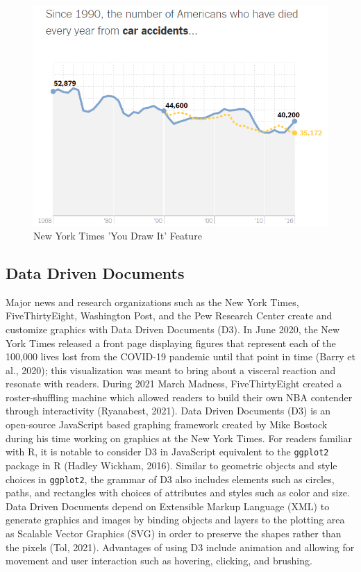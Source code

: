 \documentclass[print]{nuthesis}
\begin{document}
\begin{figure}[tbp]

{\centering \includegraphics[width=0.75\linewidth,]{images/02-you-draw-it/nyt-caraccidents-frame4} 

}

\caption{New York Times 'You Draw It' Feature}\label{fig:nyt-caraccidents}
\end{figure}

\hypertarget{data-driven-documents}{%
\subsection{Data Driven Documents}\label{data-driven-documents}}

Major news and research organizations such as the New York Times, FiveThirtyEight, Washington Post, and the Pew Research Center create and customize graphics with Data Driven Documents (D3).
In June 2020, the New York Times released a front page displaying figures that represent each of the 100,000 lives lost from the COVID-19 pandemic until that point in time (Barry et al., 2020); this visualization was meant to bring about a visceral reaction and resonate with readers.
During 2021 March Madness, FiveThirtyEight created a roster-shuffling machine which allowed readers to build their own NBA contender through interactivity (Ryanabest, 2021).
Data Driven Documents (D3) is an open-source JavaScript based graphing framework created by Mike Bostock during his time working on graphics at the New York Times.
For readers familiar with R, it is notable to consider D3 in JavaScript equivalent to the \texttt{ggplot2} package in R (Hadley Wickham, 2016). 
Similar to geometric objects and style choices in \texttt{ggplot2}, the grammar of D3 also includes elements such as circles, paths, and rectangles with choices of attributes and styles such as color and size.
Data Driven Documents depend on Extensible Markup Language (XML) to generate graphics and images by binding objects and layers to the plotting area as Scalable Vector Graphics (SVG) in order to preserve the shapes rather than the pixels  (Tol, 2021).
Advantages of using D3 include animation and allowing for movement and user interaction such as hovering, clicking, and brushing.
\end{document}
